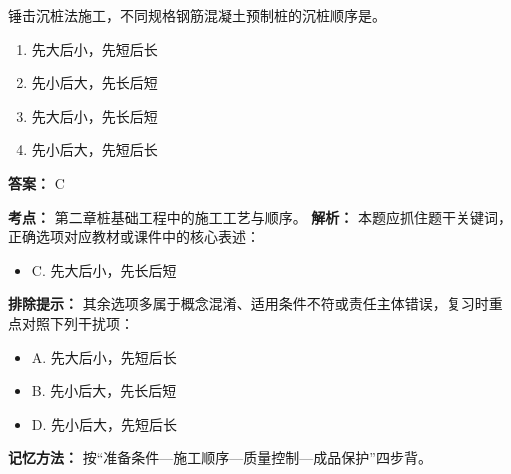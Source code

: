 \documentclass[UTF8,fontset=fandol,11pt]{ctexart}
\begin{document}
\begin{quizbox}[title={第 9 题}]
锤击沉桩法施工，不同规格钢筋混凝土预制桩的沉桩顺序是。\\
\begin{enumerate}[label=\Alph*.]
\item 先大后小，先短后长
\item 先小后大，先长后短
\item 先大后小，先长后短
\item 先小后大，先短后长
\end{enumerate}
\textbf{答案：} C
\vspace{0.25em}
\begin{answerbox}[title={考点解析}]
\textbf{考点：} 第二章桩基础工程中的施工工艺与顺序。
\textbf{解析：} 本题应抓住题干关键词，正确选项对应教材或课件中的核心表述：
\begin{itemize}
\item C. 先大后小，先长后短
\end{itemize}
\textbf{排除提示：} 其余选项多属于概念混淆、适用条件不符或责任主体错误，复习时重点对照下列干扰项：
\begin{itemize}
\item A. 先大后小，先短后长
\item B. 先小后大，先长后短
\item D. 先小后大，先短后长
\end{itemize}
\textbf{记忆方法：} 按“准备条件—施工顺序—质量控制—成品保护”四步背。
\end{answerbox}
\end{quizbox}
\end{document}
